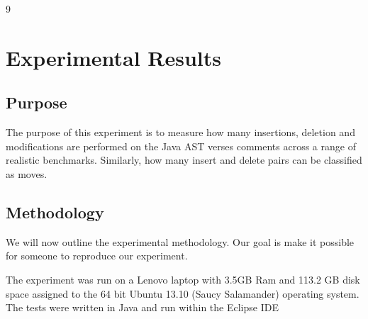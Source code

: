 9
\chapter{Experimental Results}

\section{Purpose}
The purpose of this experiment is to measure how many insertions, deletion and modifications are performed on the Java AST verses comments across a range of realistic benchmarks. Similarly, how many insert and delete pairs can be classified as moves. 


\section{Methodology}
We will now outline the experimental methodology. Our goal is make it possible for someone to reproduce our experiment.

The experiment was run on a Lenovo laptop with 3.5GB Ram and 113.2 GB disk space assigned to the 64 bit Ubuntu 13.10 (Saucy Salamander) operating system. The tests were written in Java and run within the Eclipse IDE



